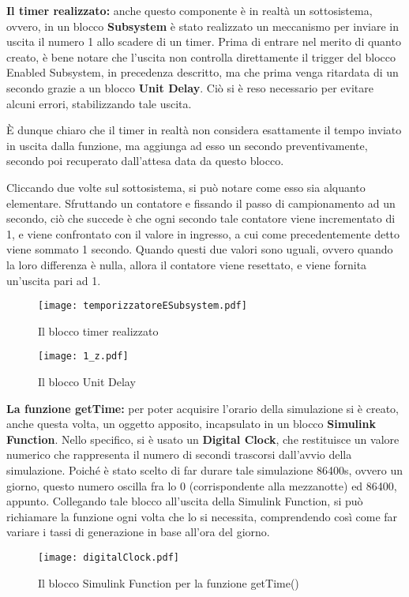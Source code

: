 \textbf{Il timer realizzato:} anche questo componente è in realtà un sottosistema, ovvero, in un blocco \textbf{Subsystem\cite{subsystem}} è stato realizzato un meccanismo per inviare in uscita il numero 1 allo scadere di un timer. Prima di entrare nel merito di quanto creato, è bene notare che l’uscita non controlla direttamente il trigger del blocco Enabled Subsystem, in precedenza descritto, ma che prima venga ritardata di un secondo grazie a un blocco \textbf{Unit Delay\cite{delay}}. Ciò si è reso necessario per evitare alcuni errori, stabilizzando tale uscita.

È dunque chiaro che il timer in realtà non considera esattamente il tempo inviato in uscita dalla funzione, ma aggiunga ad esso un secondo preventivamente, secondo poi recuperato dall’attesa data da questo blocco.

Cliccando due volte sul sottosistema, si può notare come esso sia alquanto elementare. Sfruttando un contatore e fissando il passo di campionamento ad un secondo, ciò che succede è che ogni secondo tale contatore viene incrementato di 1, e viene confrontato con il valore in ingresso, a cui come precedentemente detto viene sommato 1 secondo. Quando questi due valori sono uguali, ovvero quando la loro differenza è nulla, allora il contatore viene resettato, e viene fornita un’uscita pari ad 1.
\begin{figure}[H]
  \texttt{[image: temporizzatoreESubsystem.pdf]}
  \caption{Il blocco timer realizzato}
  \label{fig:timersub}
\end{figure}
\begin{figure}[H]
\center
  \texttt{[image: 1\_z.pdf]}
  \caption{Il blocco Unit Delay}
  \label{fig:unitdelay}
\end{figure}
\newpage
\textbf{La funzione getTime:} per poter acquisire l'orario della simulazione si è creato, anche questa volta, un oggetto apposito, incapsulato in un blocco \textbf{Simulink Function\cite{simfunc}}. Nello specifico, si è usato un \textbf{Digital Clock\cite{digclock}}, che restituisce un valore numerico che rappresenta il numero di secondi trascorsi dall'avvio della simulazione. Poiché è stato scelto di far durare tale simulazione 86400s, ovvero un giorno, questo numero oscilla fra lo 0 (corrispondente alla mezzanotte) ed 86400, appunto. Collegando tale blocco all'uscita della Simulink Function, si può richiamare la funzione ogni volta che lo si necessita, comprendendo così come far variare i tassi di generazione in base all'ora del giorno.
\begin{figure}[H]
  \texttt{[image: digitalClock.pdf]}
  \caption{Il blocco Simulink Function per la funzione getTime()}
  \label{fig:gettime}
\end{figure}














